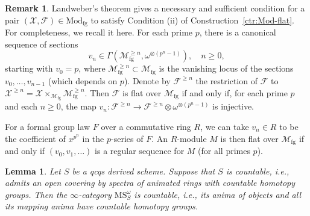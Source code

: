 \documentclass{amsart}
\numberwithin{equation}{section}
\theoremstyle{plain}
\newtheorem{lemma}[equation]{Lemma}
\theoremstyle{definition}
\newtheorem{remark}[equation]{Remark}
\let\scr=\mathcal
\let\cat=\mathrm
\def\Mod{\cat{M}\mathrm{od}{}}
\def\MS{\mathrm{MS}}
\def\fg{\mathrm{fg}}
\begin{document}
\begin{remark}
	Landweber's theorem \cite[Lecture 16]{Lurie:2010} gives a necessary and sufficient condition for a pair $(\scr X,\scr F)\in\Mod_\fg$ to satisfy Condition (ii) of Construction~\ref{ctr:Mod-flat}. For completeness, we recall it here. For each prime $p$, there is a canonical sequence of sections
	\[
	v_n\in \Gamma(\scr M_\fg^{\geq n},\omega^{\otimes (p^n-1)}), \quad n\geq 0,
	\]
	starting with $v_0=p$, where $\scr M_\fg^{\geq n}\subset\scr M_\fg$ is the vanishing locus of the sections $v_0,\dotsc,v_{n-1}$ (which depends on $p$).
	Denote by $\scr F^{\geq n}$ the restriction of $\scr F$ to $\scr X^{\geq n}=\scr X\times_{\scr M_\fg}\scr M_\fg^{\geq n}$. Then $\scr F$ is flat over $\scr M_\fg$ if and only if, for each prime $p$ and each $n\geq 0$, the map $v_n\colon \scr F^{\geq n}\to \scr F^{\geq n}\otimes\omega^{\otimes (p^n-1)}$ is injective.
	
	For a formal group law $F$ over a commutative ring $R$, we can take $v_n\in R$ to be the coefficient of $x^{p^n}$ in the $p$-series of $F$. An $R$-module $M$ is then flat over $\scr M_\fg$ if and only if $(v_0,v_1,\dotsc)$ is a regular sequence for $M$ (for all primes $p$).
\end{remark}

\begin{lemma}\label{lem:countable}
	Let $S$ be a qcqs derived scheme. Suppose that $S$ is countable, i.e., admits an open covering by spectra of animated rings with countable homotopy groups. Then the $\infty$-category $\MS_S^\omega$ is countable, i.e., its anima of objects and all its mapping anima have countable homotopy groups.
\end{lemma}
\end{document}
